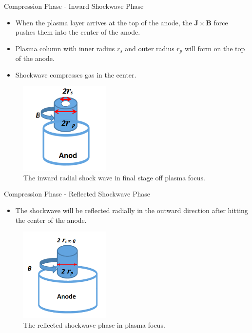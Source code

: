\begin{frame} {Compression Phase - Inward Shockwave Phase}
    \begin{itemize}
        \item When the plasma layer arrives at the top of the anode, the $\mathbf{J\times B}$ force pushes them into the center of the anode.
        \item Plasma column with inner radius $r_s$ and outer radius $r_p$ will form on the top of the anode.
        \item Shockwave compresses gas in the center.
    \end{itemize}
    \begin{figure}
        \centering
        \includegraphics[width=0.4\textwidth]{figures/inward-shockwave-phase.png}
        \caption{The inward radial shock wave in final stage off plasma focus.}
        \label{fig:inward-shockwave-phase}
    \end{figure}
\end{frame}

\begin{frame} {Compression Phase - Reflected Shockwave Phase}
    \begin{itemize}
        \item The shockwave will be reflected radially in the outward direction after hitting the center of the anode.
    \end{itemize}
    \begin{figure}
        \centering
        \includegraphics[width=0.4\textwidth]{figures/reflected-shockwave-phase.png}
        \caption{The reflected shockwave phase in plasma focus. \cite{behbahani_2017_enhancement}}
        \label{fig:reflected-shockwave-phase}
    \end{figure}
\end{frame}

